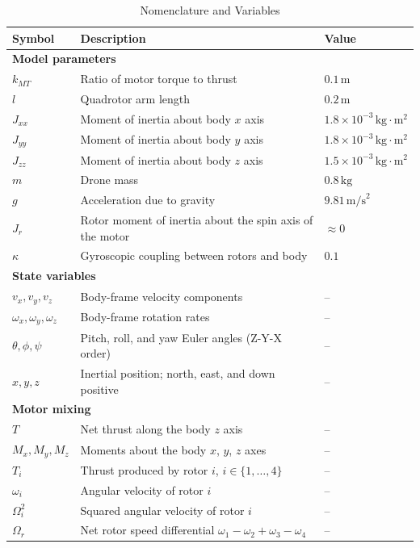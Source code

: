 \documentclass[conf]{new-aiaa}
\begin{document}
\begin{table}[!htbp]
\centering
\caption{Nomenclature and Variables}
\label{tab:constants}
\renewcommand{\arraystretch}{0.90}
\begin{tabular}{lll}
\toprule
\textbf{Symbol} & \textbf{Description} & \textbf{Value} \\
\midrule
\multicolumn{3}{l}{\textbf{Model parameters}} \\
$k_{MT}$ & Ratio of motor torque to thrust & $0.1\,\text{m}$ \\
$l$ & Quadrotor arm length & $0.2\,\text{m}$ \\
$J_{xx}$ & Moment of inertia about body $x$ axis & $1.8\times10^{-3}\,\text{kg}\cdot\text{m}^2$ \\
$J_{yy}$ & Moment of inertia about body $y$ axis & $1.8\times10^{-3}\,\text{kg}\cdot\text{m}^2$ \\
$J_{zz}$ & Moment of inertia about body $z$ axis & $1.5\times10^{-3}\,\text{kg}\cdot\text{m}^2$ \\
$m$ & Drone mass & $0.8\,\text{kg}$ \\
$g$ & Acceleration due to gravity & $9.81\,\text{m/s}^2$ \\
$J_r$ & Rotor moment of inertia about the spin axis of the motor & $\approx 0$ \\
$\kappa$ & Gyroscopic coupling between rotors and body & $0.1$ \\
\midrule
\multicolumn{3}{l}{\textbf{State variables}} \\
$v_x, v_y, v_z$ & Body-frame velocity components & -- \\
$\omega_x, \omega_y, \omega_z$ & Body-frame rotation rates & -- \\
$\theta, \phi, \psi$ & Pitch, roll, and yaw Euler angles (Z-Y-X order) & -- \\
$x, y, z$ & Inertial position; north, east, and down positive & -- \\
\midrule
\multicolumn{3}{l}{\textbf{Motor mixing}} \\
$T$ & Net thrust along the body $z$ axis & -- \\
$M_x, M_y, M_z$ & Moments about the body $x$, $y$, $z$ axes & -- \\
$T_i$ & Thrust produced by rotor $i$, $i \in \{1,\dots,4\}$ & -- \\
$\omega_i$ & Angular velocity of rotor $i$ & -- \\
$\Omega_i^2$ & Squared angular velocity of rotor $i$ & -- \\
$\Omega_r$ & Net rotor speed differential $\omega_1-\omega_2+\omega_3-\omega_4$ & -- \\

\end{tabular}
\end{table}
\end{document}
